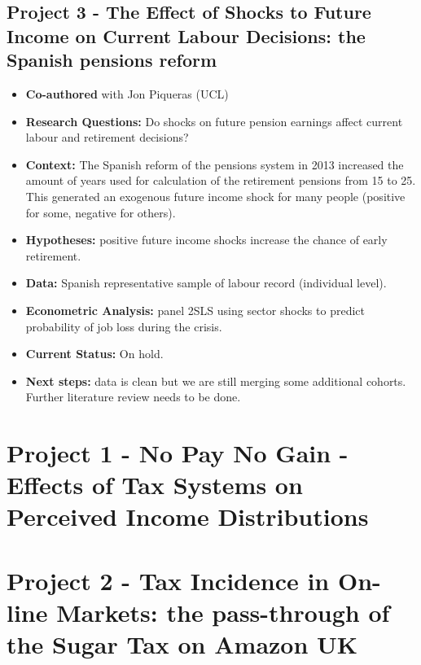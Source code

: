 \documentclass[12pt]{article}%
\begin{document}
\subsection*{Project 3 - The Effect of Shocks to Future Income on Current Labour Decisions: the Spanish pensions reform}

\begin{itemize}
	\item \textbf{Co-authored} with Jon Piqueras (UCL)
	\item \textbf{Research Questions:} Do shocks on future pension earnings affect current labour and retirement decisions? 
	\item \textbf{Context:} The Spanish reform of the pensions system in 2013 increased the amount of years used for calculation of the retirement pensions from 15 to 25. This generated an exogenous future income shock for many people (positive for some, negative for others).
	\item \textbf{Hypotheses:} positive future income shocks increase the chance of early retirement.
	\item \textbf{Data:} Spanish representative sample of labour record (individual level).
	\item \textbf{Econometric Analysis:} panel 2SLS using sector shocks to predict probability of job loss during the crisis.
	\item \textbf{Current Status:} On hold.
	\item \textbf{Next steps:} data is clean but we are still merging some additional cohorts. Further literature review needs to be done.
\end{itemize}

\newpage
\section{Project 1 - No Pay No Gain - Effects of Tax Systems on Perceived Income Distributions}



\newpage
\section{Project 2 - Tax Incidence in On-line Markets: the pass-through of the Sugar Tax on Amazon UK}
\end{document}
